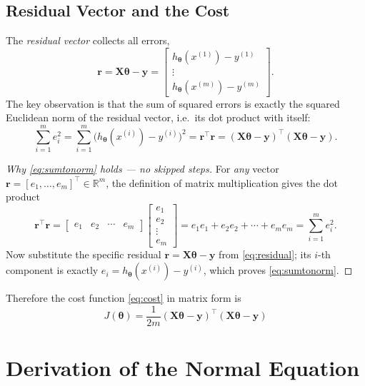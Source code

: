 \documentclass[11pt,a4paper]{report}
\theoremstyle{definition}
\theoremstyle{plain}
\theoremstyle{remark}
\newcommand{\R}{\mathbb{R}}
\newcommand{\vy}{\mathbf{y}}
\newcommand{\vw}{\bm{\theta}}          %
\newcommand{\Xmat}{\mathbf{X}}
\newcommand{\htheta}{h_{\bm{\theta}}}
\begin{document}
	\section{Residual Vector and the Cost}
	The \emph{residual vector} collects all errors,
	\begin{equation}
		\mathbf{r}=\Xmat\vw-\vy
		=\begin{bmatrix}\htheta(x^{(1)})-y^{(1)}\\\vdots\\\htheta(x^{(m)})-y^{(m)}\end{bmatrix}.
		\label{eq:residual}
	\end{equation}
	The key observation is that the sum of squared errors is exactly the squared
	Euclidean norm of the residual vector, i.e.\ its dot product with itself:
	\begin{equation}
		\sum_{i=1}^{m}e_i^2
		=\sum_{i=1}^{m}\bigl(\htheta(x^{(i)})-y^{(i)}\bigr)^2
		=\mathbf{r}^{\!\top}\mathbf{r}
		=(\Xmat\vw-\vy)^{\!\top}(\Xmat\vw-\vy).
		\label{eq:sumtonorm}
	\end{equation}
	
	\begin{proof}[Why \eqref{eq:sumtonorm} holds --- no skipped steps]
		For \emph{any} vector $\mathbf{r}=[e_1,\dots,e_m]^{\!\top}\in\R^{m}$, the
		definition of matrix multiplication gives the dot product
		\[
		\mathbf{r}^{\!\top}\mathbf{r}
		=\begin{bmatrix}e_1&e_2&\cdots&e_m\end{bmatrix}
		\begin{bmatrix}e_1\\e_2\\\vdots\\e_m\end{bmatrix}
		=e_1e_1+e_2e_2+\cdots+e_me_m
		=\sum_{i=1}^{m}e_i^2 .
		\]
		Now substitute the specific residual $\mathbf{r}=\Xmat\vw-\vy$ from
		\eqref{eq:residual}; its $i$-th component is exactly
		$e_i=\htheta(x^{(i)})-y^{(i)}$, which proves \eqref{eq:sumtonorm}.
	\end{proof}
	
	Therefore the cost function \eqref{eq:cost} in matrix form is
	\begin{equation}
		\boxed{\;J(\vw)=\frac{1}{2m}(\Xmat\vw-\vy)^{\!\top}(\Xmat\vw-\vy)\;}
		\label{eq:matcost}
	\end{equation}
	
	\chapter{Derivation of the Normal Equation}
	\label{ch:normaleq}
	
\end{document}
